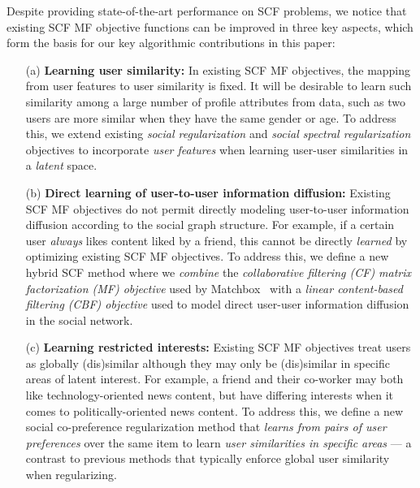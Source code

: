 Despite providing state-of-the-art performance on SCF problems, we
notice that existing SCF MF objective functions can be improved in
three key aspects, which form the basis for our key algorithmic
contributions in this paper:
\begin{enumerate}
\item[(a)] {\bf Learning user similarity:}
In existing SCF MF objectives, the mapping from user features to user
similarity is fixed.  It will be desirable to learn such similarity
among a large number of profile attributes from data, such as two
users are more similar when they have the same gender or age.
To address this, we extend existing \emph{social regularization} and
\emph{social spectral regularization} objectives to incorporate
\emph{user features} when learning user-user similarities in a
\emph{latent} space.
\item[(b)] {\bf Direct learning of user-to-user information diffusion:}
Existing SCF MF objectives do not permit directly modeling
user-to-user information diffusion according to the social graph
structure.  For example, if a certain user \emph{always} likes content
liked by a friend, this cannot be directly \emph{learned} by
optimizing existing SCF MF objectives.
To address this, we define a new hybrid SCF method where we
\emph{combine} the \emph{collaborative filtering (CF) matrix
factorization (MF) objective} used by Matchbox~\cite{matchbox} with a
\emph{linear content-based filtering (CBF) objective} used to model
direct user-user information diffusion in the social network.
\item[(c)] {\bf Learning restricted interests:} 
Existing SCF MF objectives treat users as globally (dis)similar
although they may only be (dis)similar in specific areas of latent interest.
For example, a friend and their co-worker may both like
technology-oriented news content, but have differing interests when it
comes to politically-oriented news content.
To address this, we define a new social co-preference regularization
method that \emph{learns from pairs of user preferences} over the same
item to learn \emph{user similarities in specific areas} --- a
contrast to previous methods that typically enforce global user
similarity when regularizing.
\end{enumerate}

